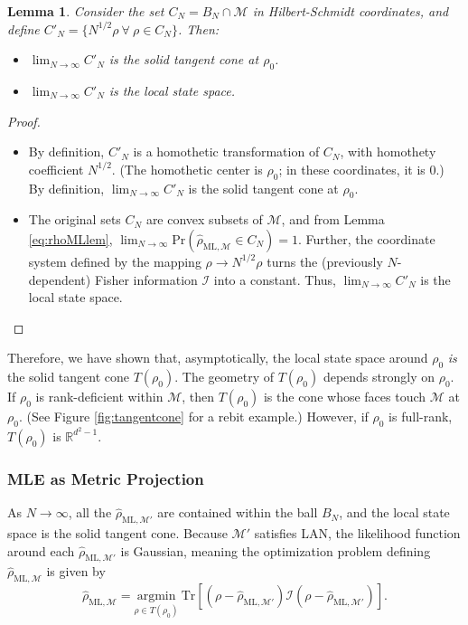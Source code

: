 \documentclass[aps,pra, twocolumn]{revtex4-1}
\newcommand{\M}{\mathcal{M}}
\newcommand{\rhohat}{\hat{\rho}}
\newcommand{\rhoML}[1]{\rhohat_{\scriptscriptstyle{\mathrm{ML},#1}}}
\newtheorem{lem}{Lemma}
\begin{document}
\begin{lem}Consider the set $C_{N} = B_{N} \cap \M$ in Hilbert-Schmidt coordinates, and define $C'_{N} = \{N^{1/2}\rho~\forall~\rho \in C_{N}\}$. Then:
\begin{itemize}
\item [1)] $\lim_{N\rightarrow \infty}C'_{N}$ is the solid tangent cone at $\rho_{0}$.
\item [2)] $\lim_{N\rightarrow \infty}C'_{N}$ is the local state space.
\end{itemize}
\end{lem}
\begin{proof}~\\
\begin{itemize}
\item [1)] By definition, $C'_{N}$ is a homothetic transformation of $C_{N}$, with homothety coefficient $N^{1/2}$. (The homothetic center is $\rho_{0}$; in these coordinates, it is 0.) By definition, $\lim_{N\rightarrow \infty}C'_{N}$ is the solid tangent cone at $\rho_{0}$.
\item [2)] The original sets $C_{N}$ are convex subsets of $\M$, and from Lemma \ref{eq:rhoMLlem}, $\lim_{N\rightarrow \infty}\mathrm{Pr}(\rhoML{\M} \in C_{N}) = 1$.  Further, the coordinate system defined by the mapping $\rho \rightarrow N^{1/2}\rho$ turns the (previously $N$-dependent) Fisher information $\mathcal{I}$ into a constant. Thus, $\lim_{N\rightarrow \infty}C'_{N}$ is the local state space.
\end{itemize}
\end{proof}

Therefore, we have shown that, asymptotically, the local state space around $\rho_{0}$ \emph{is} the solid tangent cone $T(\rho_{0})$.
The geometry of $T(\rho_{0})$ depends strongly on $\rho_{0}$. If $\rho_{0}$ is rank-deficient within $\M$, then $T(\rho_{0})$ is the cone whose faces touch $\M$ at $\rho_{0}$. (See Figure \ref{fig:tangentcone} for a rebit example.) However, if $\rho_{0}$ is full-rank, $T(\rho_{0})$ is $\mathbb{R}^{d^{2}-1}$.

\subsubsection{MLE as Metric Projection}

As $N \rightarrow \infty$, all the $\rhoML{\M'}$ are contained within the ball $B_{N}$, and the local state space is the solid tangent cone. Because $\M'$ satisfies LAN, the likelihood function around each $\rhoML{\M'}$ is Gaussian, meaning the optimization problem defining $\rhoML{\M}$ is given by \begin{equation}
\label{eq:MP-LANmle2}
\rhoML{\M} = \underset{\rho \in T(\rho_{0})}{\text{argmin}}~\mathrm{Tr}[(\rho  -\rhoML{\M'})\mathcal{I}(\rho  -\rhoML{\M'})].
\end{equation}
\end{document}
